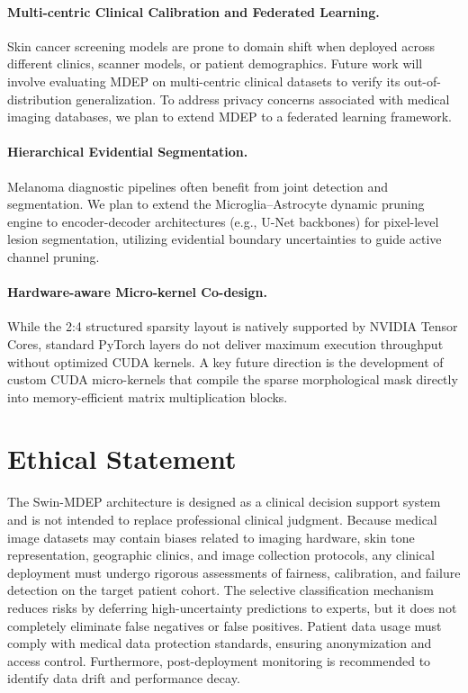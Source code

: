 \documentclass[letterpaper]{article} %
\begin{document}
\paragraph{Multi-centric Clinical Calibration and Federated Learning.} Skin cancer screening models are prone to domain shift when deployed across different clinics, scanner models, or patient demographics. Future work will involve evaluating MDEP on multi-centric clinical datasets to verify its out-of-distribution generalization. To address privacy concerns associated with medical imaging databases, we plan to extend MDEP to a federated learning framework.

\paragraph{Hierarchical Evidential Segmentation.} Melanoma diagnostic pipelines often benefit from joint detection and segmentation. We plan to extend the Microglia--Astrocyte dynamic pruning engine to encoder-decoder architectures (e.g., U-Net backbones) for pixel-level lesion segmentation, utilizing evidential boundary uncertainties to guide active channel pruning.

\paragraph{Hardware-aware Micro-kernel Co-design.} While the 2:4 structured sparsity layout is natively supported by NVIDIA Tensor Cores, standard PyTorch layers do not deliver maximum execution throughput without optimized CUDA kernels. A key future direction is the development of custom CUDA micro-kernels that compile the sparse morphological mask directly into memory-efficient matrix multiplication blocks.

\section{Ethical Statement}\label{sec:ethics}

The Swin-MDEP architecture is designed as a clinical decision support system and is not intended to replace professional clinical judgment. Because medical image datasets may contain biases related to imaging hardware, skin tone representation, geographic clinics, and image collection protocols, any clinical deployment must undergo rigorous assessments of fairness, calibration, and failure detection on the target patient cohort. The selective classification mechanism reduces risks by deferring high-uncertainty predictions to experts, but it does not completely eliminate false negatives or false positives. Patient data usage must comply with medical data protection standards, ensuring anonymization and access control. Furthermore, post-deployment monitoring is recommended to identify data drift and performance decay.
\end{document}
